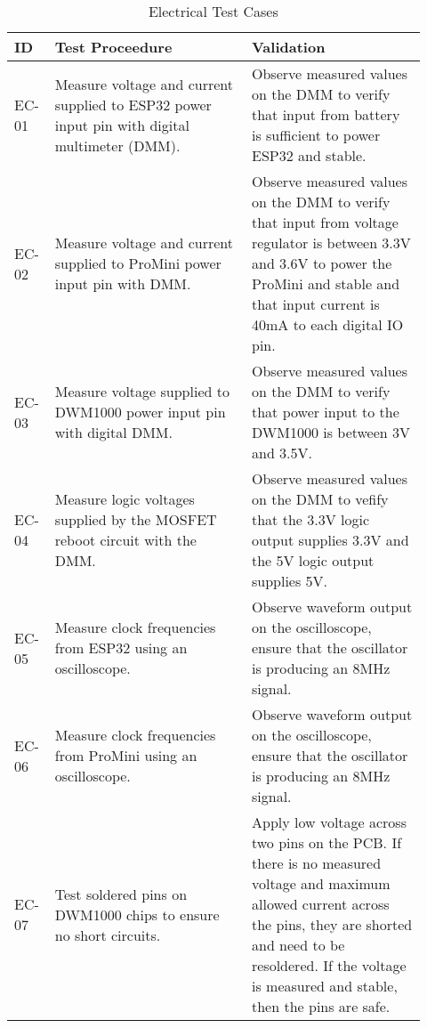 \begin{table}[h!]
    \centering
    \begin{tabular}{|p{0.07\linewidth}|p{0.45\linewidth}|p{0.40\linewidth}|} 
    \hline
    ID & Test Proceedure & Validation\\ 

    \hline
    EC-01
    & Measure voltage and current supplied to ESP32 power input pin with digital multimeter (DMM).
    & Observe measured values on the DMM to verify that input from battery is sufficient to power ESP32 and stable. \\ 

    \hline
    EC-02
    & Measure voltage and current supplied to ProMini power input pin with DMM.
    & Observe measured values on the DMM to verify that input from voltage regulator is between 3.3V and 3.6V to power the ProMini and   stable and that input current is 40mA to each digital IO pin. \\

    \hline
    EC-03
    & Measure voltage supplied to DWM1000 power input pin with digital DMM.
    & Observe measured values on the DMM to verify that power input to the DWM1000 is between 3V and 3.5V. \\

    \hline
    EC-04
    & Measure logic voltages supplied by the MOSFET reboot circuit with the DMM.
    & Observe measured values on the DMM to vefify that the 3.3V logic output supplies 3.3V and the 5V logic output supplies 5V. \\

    \hline
    EC-05
    & Measure clock frequencies from ESP32 using an oscilloscope.
    & Observe waveform output on the oscilloscope, ensure that the oscillator is producing an 8MHz signal. \\

    \hline
    EC-06
    & Measure clock frequencies from ProMini using an oscilloscope.
    & Observe waveform output on the oscilloscope, ensure that the oscillator is producing an 8MHz signal. \\

    \hline
    EC-07
    & Test soldered pins on DWM1000 chips to ensure no short circuits.
    & Apply low voltage across two pins on the PCB. If there is no measured voltage and maximum allowed current across the pins, they are shorted and need to be resoldered. If the voltage is measured and stable, then the pins are safe. \\

    \hline
    \end{tabular}
    \caption{Electrical Test Cases}
\end{table}
%